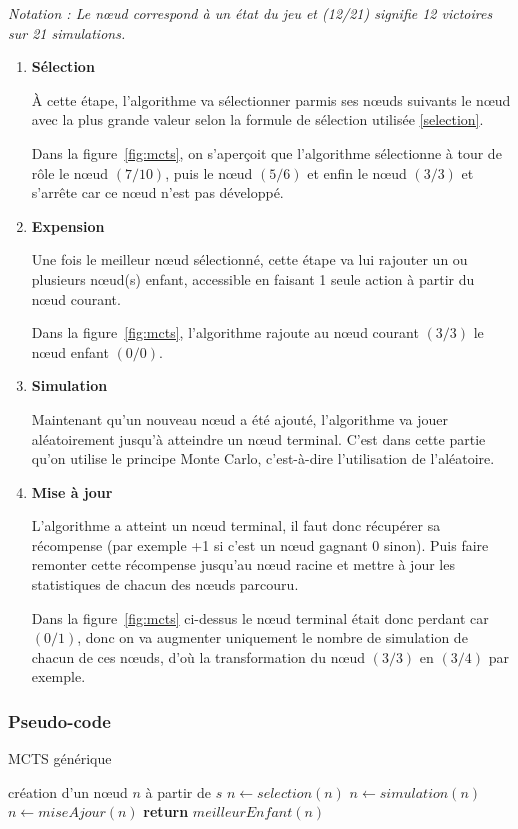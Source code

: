 \documentclass[pdftex,french, english]{article}	%
\begin{document}
\textit{Notation : Le nœud correspond à un état du jeu et (12/21) signifie 12 victoires sur 21 simulations.} 
	\begin{enumerate}
		\item \textbf{Sélection}

		À cette étape, l'algorithme va sélectionner parmis ses nœuds suivants le nœud avec la plus grande valeur selon la formule de sélection utilisée \ref{selection}. 

		Dans la figure~\ref{fig:mcts}, on s'aperçoit que l'algorithme sélectionne à tour de rôle le nœud $(7/10)$, puis le nœud $(5/6)$ et enfin le nœud $(3/3)$ et s'arrête car ce nœud n'est pas développé.
		\item \textbf{Expension}

		Une fois le meilleur nœud sélectionné, cette étape va lui rajouter un ou plusieurs nœud(s) enfant, accessible en faisant 1 seule action à partir du nœud courant. 

		Dans la figure~\ref{fig:mcts}, l'algorithme rajoute au nœud courant $(3/3)$ le nœud enfant $(0/0)$.
		\item \textbf{Simulation}

		Maintenant qu'un nouveau nœud a été ajouté, l'algorithme va jouer aléatoirement jusqu'à atteindre un nœud terminal.
		C'est dans cette partie qu'on utilise le principe Monte Carlo, c'est-à-dire l'utilisation de l'aléatoire.
		\item \textbf{Mise à jour} 

		L'algorithme a atteint un nœud terminal, il faut donc récupérer sa récompense (par exemple +1 si c'est un nœud gagnant 0 sinon). Puis faire remonter cette récompense jusqu'au nœud racine et mettre à jour les statistiques de chacun des nœuds parcouru. 

		Dans la figure~\ref{fig:mcts} ci-dessus le nœud terminal était donc perdant car $(0/1)$, donc on va augmenter uniquement le nombre de simulation de chacun de ces nœuds, d'où la transformation du nœud $(3/3)$ en $(3/4)$ par exemple.
	\end{enumerate}
	\subsubsection{Pseudo-code}
	\begin{algorithm}
	\caption{MCTS générique}
	  \label{alg:mcts}
	\begin{algorithmic}[1]
	\State création d'un nœud $n$ à partir de $s$
			\State $n \gets selection(n)$ 
			\State $n \gets simulation(n)$
			\State $n \gets miseAjour(n)$
		\EndWhile
	\State \textbf{return} $meilleurEnfant(n)$
	\EndFunction
	\end{algorithmic}
	\end{algorithm}
    
\end{document}
